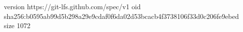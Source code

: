 version https://git-lfs.github.com/spec/v1
oid sha256:b0595ab99d5b298a29e9cdaf0f6da02d53bcacb4f3738106f33d0c206fe9ebed
size 1072
